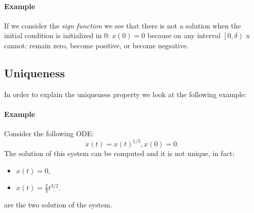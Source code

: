 \paragraph{Example} If we consider the \emph{sign function} we see that there is not a solution when the initial condition is initialized in 0: $x(0)=0$ because on any interval $\left[0,\delta\right)$ x cannot: remain zero, become positive, or become negsative.

\begin{center}
\end{center}

\subsection{Uniqueness}
In order to explain the uniqueness property we look at the following example:
\paragraph{Example} Consider the following ODE: 
\[
\dot{x}(t)=x(t)^{1/3}, x(0)=0.
\]
The solution of this system can be computed and it is not unique, in fact:
\begin{itemize}
	\item $x(t)=0$,
	\item $x(t)=\frac{2}{3}t^{3/2}.$
\end{itemize}
are the two solution of the system.


\begin{center}
\end{center}

